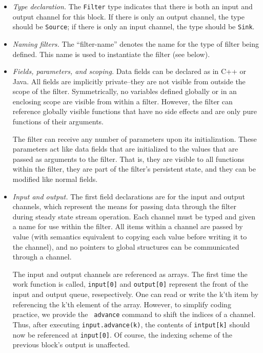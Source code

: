 \documentclass[draft]{article}
\begin{document}
\begin{itemize}

\item {\it Type declaration.}  The {\tt Filter} type indicates that
there is both an input and output channel for this block.  If there is
only an output channel, the type should be {\tt Source}; if there is
only an input channel, the type should be {\tt Sink}.

\item {\it Naming filters.}  The ``filter-name'' denotes the name for
the type of filter being defined.  This name is used to instantiate
the filter (see below).

\item {\it Fields, parameters, and scoping.}  Data fields can be
declared as in C++ or Java.  All fields are implicitly private--they
are not visible from outside the scope of the filter.  Symmetrically,
no variables defined globally or in an enclosing scope are visible
from within a filter.  However, the filter can reference globally
visible functions that have no side effects and are only pure
functions of their arguments.

The filter can receive any number of parameters upon its
initialization.  These parameters act like data fields that are
initialized to the values that are passed as arguments to the filter.
That is, they are visible to all functions within the filter, they are
part of the filter's persistent state, and they can be modified like
normal fields.

\item {\it Input and output.}  The first field declarations are for
the input and output channels, which represent the means for passing
data through the filter during steady state stream operation.  Each
channel must be typed and given a name for use within the filter.  All
items within a channel are passed by value (with semantics equivalent
to copying each value before writing it to the channel), and no
pointers to global structures can be communicated through a channel.

The input and output channels are referenced as arrays.  The first
time the work function is called, {\tt input[0]} and {\tt output[0]}
represent the front of the input and output queue, resepectively.  One
can read or write the k'th item by referencing the k'th element of the
array.  However, to simplify coding practice, we provide the {\tt
advance} command to shift the indices of a channel.  Thus, after
executing {\tt input.advance(k)}, the contents of {\tt intput[k]}
should now be referenced at {\tt input[0]}.  Of course, the indexing
scheme of the previous block's output is unaffected.


\end{itemize}
\end{document}
